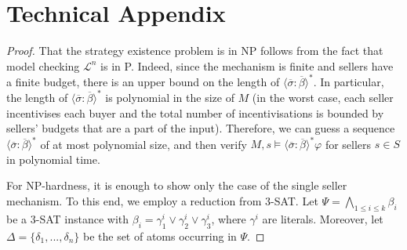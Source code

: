 \clearpage
\appendix
\section{Technical Appendix}
\strex*
\begin{proof}
   That the strategy existence problem is in NP follows from the fact that model checking $\mathcal{L}^n$ is in P. Indeed, since the mechanism is finite and sellers have a finite budget, there is an upper bound on the length of $\langle \overline{\sigma}: \overline{\beta} \rangle^\ast$. In particular, the length of $\langle \overline{\sigma}: \overline{\beta} \rangle^\ast$ is polynomial in the size of $M$ (in the worst case, each seller incentivises each buyer and the total number of incentivisations is bounded by sellers' budgets that are a part of the input). Therefore, we can guess a sequence $\langle \overline{\sigma}: \overline{\beta} \rangle^\ast$ of at most polynomial size, and then verify $M,s \models \langle \overline{\sigma}: \overline{\beta} \rangle^\ast \varphi$ for sellers $s \in S$ in polynomial time.

    For NP-hardness, it is enough to show only the case of the single seller mechanism. To this end, we employ a reduction from 3-SAT. Let $\Psi = \bigwedge_{1 \leqslant i \leqslant k} \beta_i$ be a 3-SAT instance with $\beta_i = \gamma^i_1 \lor \gamma^i_2 \lor \gamma^i_3$, where $\gamma^i$ are literals. Moreover, let $\Delta = \{\delta_1,..., \delta_n\}$ be the set of atoms occurring in $\Psi$.


\end{proof}
